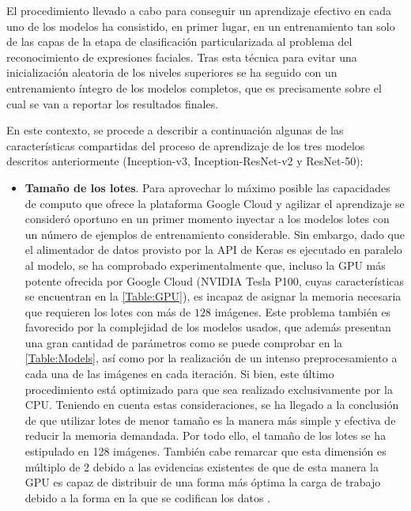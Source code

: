 El procedimiento llevado a cabo para conseguir un aprendizaje efectivo en cada uno de los modelos ha consistido, en primer lugar, en un entrenamiento tan solo de las capas de la etapa de clasificación particularizada al problema del reconocimiento de expresiones faciales. Tras esta técnica para evitar una inicialización aleatoria de los niveles superiores se ha seguido con un entrenamiento íntegro de los modelos completos, que es precisamente sobre el cual se van a reportar los resultados finales.

En este contexto, se procede a describir a continuación algunas de las características compartidas del proceso de aprendizaje de los tres modelos descritos anteriormente (Inception-v3, Inception-ResNet-v2 y ResNet-50):
\begin{itemize}
    \item \textbf{Tamaño de los lotes}. Para aprovechar lo máximo posible las capacidades de computo que ofrece la plataforma Google Cloud y agilizar el aprendizaje se consideró oportuno en un primer momento inyectar a los modelos lotes con un número de ejemplos de entrenamiento considerable. Sin embargo, dado que el alimentador de datos provisto por la API de Keras es ejecutado en paralelo al modelo, se ha comprobado experimentalmente que, incluso la GPU más potente ofrecida por Google Cloud (NVIDIA Tesla P100, cuyas características se encuentran en la \autoref{Table:GPU}), es incapaz de asignar la memoria necesaria que requieren los lotes con más de $128$ imágenes. Este problema también es favorecido por la complejidad de los modelos usados, que además presentan una gran cantidad de parámetros como se puede comprobar en la \autoref{Table:Models}, así como por la realización de un intenso preprocesamiento a cada una de las imágenes en cada iteración. Si bien, este último procedimiento está optimizado para que sea realizado exclusivamente por la CPU. Teniendo en cuenta estas consideraciones, se ha llegado a la conclusión de que utilizar lotes de menor tamaño es la manera más simple y efectiva de reducir la memoria demandada. Por todo ello, el tamaño de los lotes se ha estipulado en 128 imágenes. También cabe remarcar que esta dimensión es múltiplo de 2 debido a las evidencias existentes de que de esta manera la GPU es capaz de distribuir de una forma más óptima la carga de trabajo debido a la forma en la que se codifican los datos \cite{BatchSize}.

\end{itemize}
